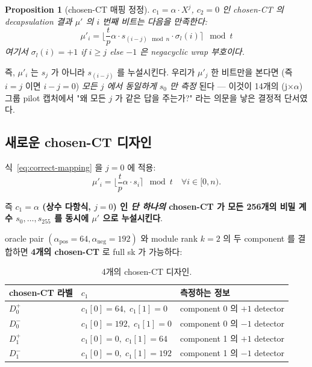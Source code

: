 \documentclass[11pt]{article}
\theoremstyle{plain}
\newtheorem{proposition}[theorem]{Proposition}
\theoremstyle{definition}
\theoremstyle{remark}
\newcommand{\round}[1]{\lfloor #1 \rceil}
\begin{document}
\begin{proposition}[chosen-CT 매핑 정정]
\label{prop:convention}
$c_1 = \alpha \cdot X^j$, $c_2 = 0$ 인 chosen-CT 의 decapsulation 결과 $\mu'$
의 $i$ 번째 비트는 다음을 만족한다:
\begin{equation}
\mu'_i = \round{\frac{t}{p} \alpha \cdot s_{(i-j) \mod n} \cdot \sigma_l(i)} \mod t
\label{eq:correct-mapping}
\end{equation}
여기서 $\sigma_l(i) = +1$ if $i \geq j$ else $-1$ 은 negacyclic wrap 부호이다.
\end{proposition}

즉, $\mu'_i$ 는 $s_j$ 가 아니라 $s_{(i-j)}$ 를 누설시킨다. 우리가 $\mu'_j$
한 비트만을 본다면 (즉 $i = j$ 이면 $i - j = 0$) \emph{모든 $j$ 에서 동일하게
$s_0$ 만 측정} 된다 — 이것이 14개의 (j$\times\alpha$) 그룹 pilot 캡처에서
"왜 모든 $j$ 가 같은 답을 주는가?" 라는 의문을 낳은 결정적 단서였다.

\subsection{새로운 chosen-CT 디자인}

식~\eqref{eq:correct-mapping} 을 $j = 0$ 에 적용:
\begin{equation}
\mu'_i = \round{\frac{t}{p} \alpha \cdot s_i} \mod t \quad \forall i \in [0, n).
\label{eq:const-c1}
\end{equation}

즉 \textbf{$c_1 = \alpha$ (상수 다항식, $j=0$) 인 \emph{단 하나의} chosen-CT 가
모든 256개의 비밀 계수 $s_0, \ldots, s_{255}$ 를 동시에 $\mu'$ 으로 누설시킨다}.

oracle pair $(\alpha_{\mathrm{pos}}=64, \alpha_{\mathrm{neg}}=192)$ 와 module rank
$k=2$ 의 두 component 를 결합하면 \textbf{4개의 chosen-CT} 로 full sk 가 가능하다:

\begin{table}[h!]
\centering
\caption{4개의 chosen-CT 디자인.}
\label{tab:4ct}
\small
\begin{tabular}{lll}
\toprule
chosen-CT 라벨 & $c_1$ & 측정하는 정보 \\
\midrule
$D_0^+$ & $c_1[0] = 64,\; c_1[1]=0$ & component 0 의 $+1$ detector \\
$D_0^-$ & $c_1[0] = 192,\; c_1[1]=0$ & component 0 의 $-1$ detector \\
$D_1^+$ & $c_1[0] = 0,\; c_1[1]=64$ & component 1 의 $+1$ detector \\
$D_1^-$ & $c_1[0] = 0,\; c_1[1]=192$ & component 1 의 $-1$ detector \\
\bottomrule
\end{tabular}
\end{table}
\end{document}
